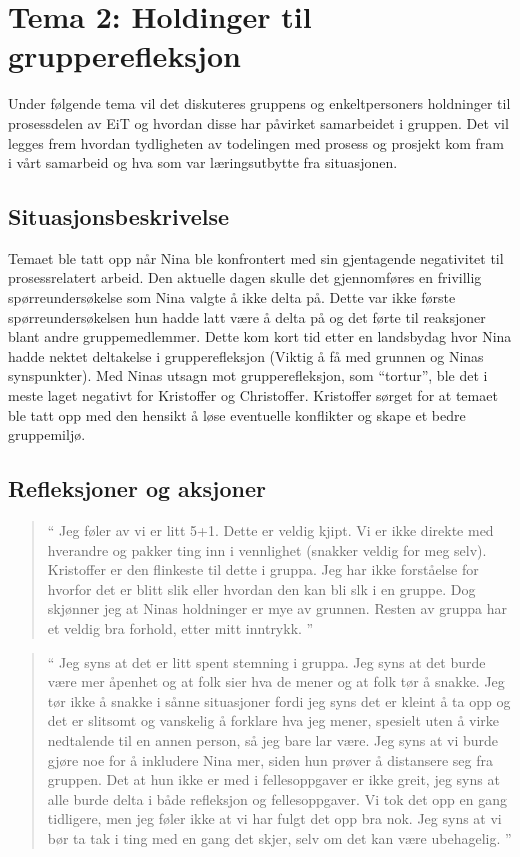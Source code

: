 \chapter{Tema 2: Holdinger til grupperefleksjon}

Under følgende tema vil det diskuteres gruppens og enkeltpersoners holdninger til prosessdelen av EiT og hvordan
disse har påvirket samarbeidet i gruppen. Det vil legges frem hvordan tydligheten av todelingen med prosess og 
prosjekt kom fram i vårt samarbeid og hva som var læringsutbytte fra situasjonen. 

\section{Situasjonsbeskrivelse}

Temaet ble tatt opp når Nina ble konfrontert med sin gjentagende negativitet til prosessrelatert arbeid. Den aktuelle 
dagen skulle det gjennomføres en frivillig spørreundersøkelse som Nina valgte å ikke delta på. Dette var ikke første 
spørreundersøkelsen hun hadde latt være å delta på og det førte til reaksjoner blant andre gruppemedlemmer. Dette 
kom kort tid etter en landsbydag hvor Nina hadde nektet deltakelse i grupperefleksjon (Viktig å få med grunnen og 
Ninas synspunkter). Med Ninas utsagn mot grupperefleksjon, som ``tortur'', ble det i meste laget
negativt for Kristoffer og Christoffer. Kristoffer sørget for at temaet ble tatt opp med den hensikt å løse eventuelle
konflikter og skape et bedre gruppemiljø.

\section{Refleksjoner og aksjoner}

\begin{quote}``
Jeg føler av vi er litt 5+1. Dette er veldig kjipt.
Vi er ikke direkte med hverandre og pakker ting inn i vennlighet (snakker veldig for meg selv). Kristoffer er den 
flinkeste til dette i gruppa.
Jeg har ikke forståelse for hvorfor det er blitt slik eller hvordan den kan bli slk i en gruppe. Dog skjønner jeg at 
Ninas holdninger er mye av grunnen. Resten av gruppa har et veldig bra forhold, etter mitt inntrykk.
''\end{quote} 

\begin{quote}``
Jeg syns at det er litt spent stemning i gruppa. Jeg syns at det burde være mer åpenhet og at folk sier hva de 
mener og at folk tør å snakke. Jeg tør ikke å snakke i sånne situasjoner fordi jeg syns det er kleint å ta opp og det 
er slitsomt og vanskelig å forklare hva jeg mener, spesielt uten å virke nedtalende til en annen person, så jeg bare 
lar være. Jeg syns at vi burde gjøre noe for å inkludere Nina mer, siden hun prøver å distansere seg fra gruppen. 
Det at hun ikke er med i fellesoppgaver er ikke greit, jeg syns at alle burde delta i både refleksjon og 
fellesoppgaver. Vi tok det opp en gang tidligere, men jeg føler ikke at vi har fulgt det opp bra nok. Jeg syns at vi bør 
ta tak i ting med en gang det skjer, selv om det kan være ubehagelig.
''\end{quote} 

